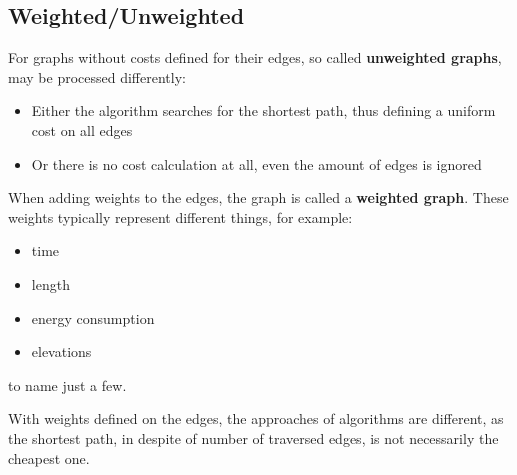 \subsection{Weighted/Unweighted}

For graphs without costs defined for their edges, so called \textbf{unweighted graphs}, may be processed differently: 
\begin{itemize}
\item Either the algorithm searches for the shortest path, thus defining a uniform cost on all edges
\item Or there is no cost calculation at all, even the amount of edges is ignored
\end{itemize}

When adding weights to the edges, the graph is called a \textbf{weighted graph}. These weights typically represent different things, for example:
\begin{itemize}
\item time
\item length
\item energy consumption
\item elevations
\end{itemize}
to name just a few.

With weights defined on the edges, the approaches of algorithms are different, as the shortest path, in despite of number of traversed edges, is not necessarily the cheapest one. 



